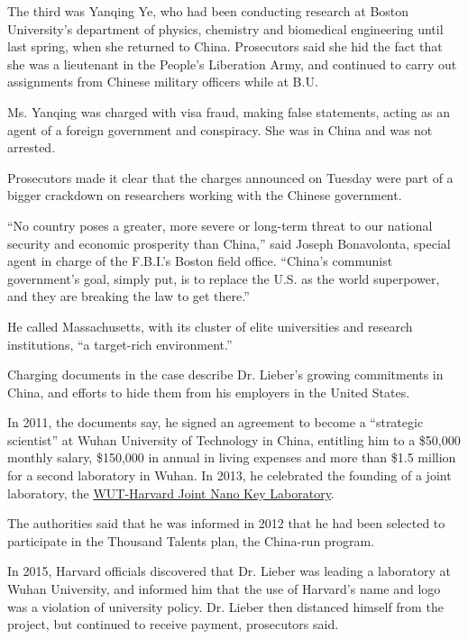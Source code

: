 The third was Yanqing Ye, who had been conducting research at Boston
University's department of physics, chemistry and biomedical engineering
until last spring, when she returned to China. Prosecutors said she hid
the fact that she was a lieutenant in the People's Liberation Army, and
continued to carry out assignments from Chinese military officers while
at B.U.

Ms. Yanqing was charged with visa fraud, making false statements, acting
as an agent of a foreign government and conspiracy. She was in China and
was not arrested.

Prosecutors made it clear that the charges announced on Tuesday were
part of a bigger crackdown on researchers working with the Chinese
government.

``No country poses a greater, more severe or long-term threat to our
national security and economic prosperity than China,'' said Joseph
Bonavolonta, special agent in charge of the F.B.I.'s Boston field
office. ``China's communist government's goal, simply put, is to replace
the U.S. as the world superpower, and they are breaking the law to get
there.''

He called Massachusetts, with its cluster of elite universities and
research institutions, ``a target-rich environment.''

Charging documents in the case describe Dr. Lieber's growing commitments
in China, and efforts to hide them from his employers in the United
States.

In 2011, the documents say, he signed an agreement to become a
``strategic scientist'' at Wuhan University of Technology in China,
entitling him to a \$50,000 monthly salary, \$150,000 in annual in
living expenses and more than \$1.5 million for a second laboratory in
Wuhan. In 2013, he celebrated the founding of a joint laboratory, the
\href{http://english.whut.edu.cn/wn/201301/t20130104_91316.htmlhttp://english.whut.edu.cn/wn/201301/t20130104_91316.html}{WUT-Harvard
Joint Nano Key Laboratory}.

The authorities said that he was informed in 2012 that he had been
selected to participate in the Thousand Talents plan, the China-run
program.

In 2015, Harvard officials discovered that Dr. Lieber was leading a
laboratory at Wuhan University, and informed him that the use of
Harvard's name and logo was a violation of university policy. Dr. Lieber
then distanced himself from the project, but continued to receive
payment, prosecutors said.


